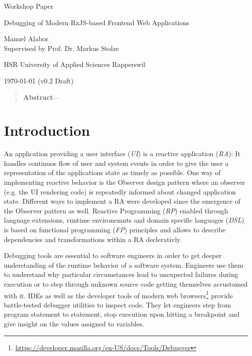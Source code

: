 \documentclass[12pt,a4paper]{article}
\newcommand{\version}{v0.2 Draft}
\begin{document}
\begin{centering}

	\Large{Workshop Paper}
	\par
	\Huge{Debugging of Modern RxJS-based Frontend Web Applications}
	\par
	\vspace{2ex}

	\normalsize{
		Manuel Alabor\\
		Supervised by Prof. Dr. Markus Stolze\\
		\par
		\vspace{2ex}
		HSR University of Applied Sciences Rapperswil\\
		\par
		\vspace{2ex}
		\today{} (\version)
	}
	\par
	\vspace{2ex}

	\begin{quotation}
		\small{
			\noindent\textbf{Abstract}---
		}
		\par
		\vspace{4ex}
	\end{quotation}
\end{centering}

\section{Introduction}

An application providing a user interface (\emph{UI}) is a reactive application (\emph{RA}): It handles continuos flow of user and system events in order to give the user a representation of the applications state as timely as possible. One way of implementing reactive behavior is the Observer design pattern \cite{gamma1995design} where an observer (e.g. the UI rendering code) is repeatedly informed about changed application state. Different ways to implement a RA were developed since the emergence of the Observer pattern as well. Reactive Programming (\emph{RP}) enabled through language extensions, runtime environemnts and domain specific languages (\emph{DSL}) is based on functional programming (\emph{FP}) principles and allows to describe dependencies and transformations within a RA declerativly.

Debugging tools are essential to software engineers in order to get deeper understanding of the runtime behavior of a software system. Engineers use them to understand why particular circumstances lead to unexpected failures during execution or to step through unknown source code getting themselves accustomed with it. IDEs as well as the developer tools of modern web browsers\footnote{\url{https://developer.mozilla.org/en-US/docs/Tools/Debugger}} provide battle-tested debugger utilities to inspect code. They let engineers step from program statement to statement, stop execution upon hitting a breakpoint and give insight on the values assigned to variables.
\end{document}

